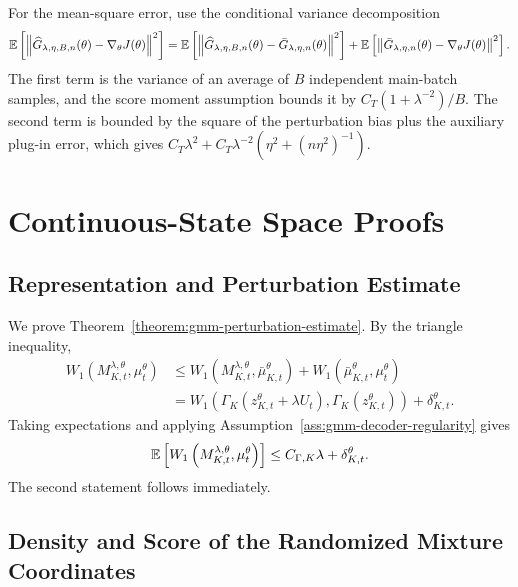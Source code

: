 For the mean-square error, use the conditional variance decomposition
\begin{align}
    \mathbb{E}\left[
        \left\|
            \widehat G_{\lambda,\eta,B,n}(\theta)-\nabla_\theta J(\theta)
        \right\|^2
    \right]
    =
    \mathbb{E}\left[
        \left\|
            \widehat G_{\lambda,\eta,B,n}(\theta)-\bar G_{\lambda,\eta,n}(\theta)
        \right\|^2
    \right]
    +
    \mathbb{E}\left[
        \left\|
            \bar G_{\lambda,\eta,n}(\theta)-\nabla_\theta J(\theta)
        \right\|^2
    \right].
\end{align}
The first term is the variance of an average of $B$ independent main-batch samples, and the score moment assumption bounds it by $C_T(1+\lambda^{-2})/B$. The second term is bounded by the square of the perturbation bias plus the auxiliary plug-in error, which gives $C_T\lambda^2+C_T\lambda^{-2}(\eta^2+(n\eta^2)^{-1})$.


\section{Continuous-State Space Proofs}
\label{appendix:continuous-proofs}

\subsection{Representation and Perturbation Estimate}
\label{appendix:gmm-perturbation-estimate}

We prove Theorem~\ref{theorem:gmm-perturbation-estimate}.
By the triangle inequality,
\begin{align}
    W_1\left(M_{K,t}^{\lambda,\theta},\mu_t^\theta \right)
    &\leq W_1\left(M_{K,t}^{\lambda,\theta},\bar\mu_{K,t}^\theta\right) + W_1\left(\bar\mu_{K,t}^\theta,\mu_t^\theta\right)\\
    &= W_1\left(\Gamma_K(z_{K,t}^\theta+\lambda U_t), \Gamma_K(z_{K,t}^\theta)\right) + \delta_{K,t}^\theta.
\end{align}
Taking expectations and applying Assumption~\ref{ass:gmm-decoder-regularity} gives
\begin{align}
    \mathbb{E}\left[ W_1\left(M_{K,t}^{\lambda,\theta},\mu_t^\theta\right)\right]\leq C_{\Gamma,K}\lambda + \delta_{K,t}^\theta.
\end{align}
The second statement follows immediately.

\subsection{Density and Score of the Randomized Mixture Coordinates}
\label{appendix:gmm-density-score-proofs}

